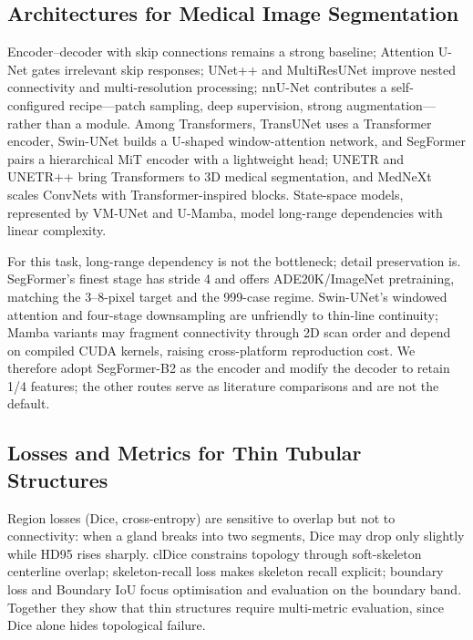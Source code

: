 \subsection{Architectures for Medical Image Segmentation}

Encoder--decoder with skip connections remains a strong baseline\cite{ronneberger2015unet}; Attention U-Net gates irrelevant skip responses\cite{oktay2018attention}; UNet++ and MultiResUNet improve nested connectivity and multi-resolution processing\cite{zhou2018unetplusplus,ibtehaz2020multiresunet}; nnU-Net contributes a self-configured recipe---patch sampling, deep supervision, strong augmentation---rather than a module\cite{isensee2021nnunet}. Among Transformers, TransUNet uses a Transformer encoder\cite{transunet}, Swin-UNet builds a U-shaped window-attention network\cite{swinunet}, and SegFormer pairs a hierarchical MiT encoder with a lightweight head\cite{segformer}; UNETR and UNETR++ bring Transformers to 3D medical segmentation\cite{unetr,unetrpp}, and MedNeXt scales ConvNets with Transformer-inspired blocks\cite{mednext}. State-space models, represented by VM-UNet and U-Mamba, model long-range dependencies with linear complexity\cite{vmunet,umamba}.

For this task, long-range dependency is not the bottleneck; detail preservation is. SegFormer's finest stage has stride 4 and offers ADE20K/ImageNet pretraining, matching the 3--8-pixel target and the 999-case regime. Swin-UNet's windowed attention and four-stage downsampling are unfriendly to thin-line continuity; Mamba variants may fragment connectivity through 2D scan order and depend on compiled CUDA kernels, raising cross-platform reproduction cost. We therefore adopt SegFormer-B2 as the encoder and modify the decoder to retain 1/4 features; the other routes serve as literature comparisons and are not the default.

\subsection{Losses and Metrics for Thin Tubular Structures}

Region losses (Dice, cross-entropy) are sensitive to overlap but not to connectivity: when a gland breaks into two segments, Dice may drop only slightly while HD95 rises sharply. clDice constrains topology through soft-skeleton centerline overlap\cite{cldice}; skeleton-recall loss makes skeleton recall explicit\cite{skeletonrecall}; boundary loss and Boundary IoU focus optimisation and evaluation on the boundary band\cite{boundaryloss,boundaryiou}. Together they show that thin structures require multi-metric evaluation, since Dice alone hides topological failure.

